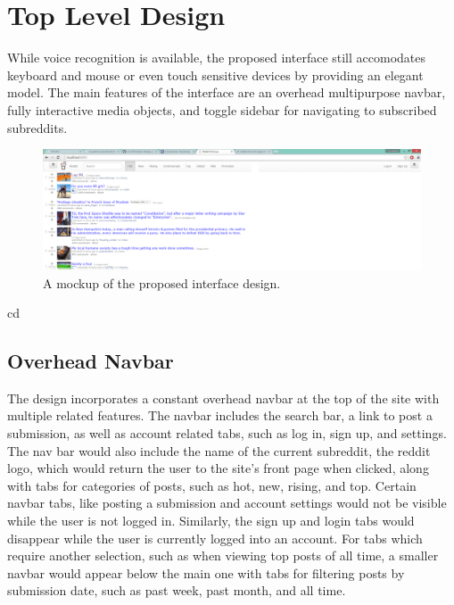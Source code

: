 \documentclass{article}
\begin{document}
\section{Top Level Design} While voice recognition is available, the proposed interface still accomodates keyboard and mouse or even touch sensitive devices by providing an elegant model. The main features of the interface are an overhead multipurpose navbar, fully interactive media objects, and toggle sidebar for navigating to subscribed subreddits.

\begin{figure}[H]
\begin{center}
\includegraphics[width=1\textwidth]{mockup.png}
\caption{A mockup of the proposed interface design.}
\end{center}
\end{figure}cd

\subsection{Overhead Navbar} The design incorporates a constant overhead navbar at the top of the site with multiple related features. The navbar includes the search bar, a link to post a submission, as well as account related tabs, such as log in, sign up, and settings. The nav bar would also include the name of the current subreddit, the reddit logo, which would return the user to the site's front page when clicked, along with tabs for categories of posts, such as hot, new, rising, and top. Certain navbar tabs, like posting a submission and account settings would not be visible while the user is not logged in. Similarly, the sign up and login tabs would disappear while the user is currently logged into an account. For tabs which require another selection, such as when viewing top posts of all time, a smaller navbar would appear below the main one with tabs for filtering posts by submission date, such as past week, past month, and all time.
\end{document}
